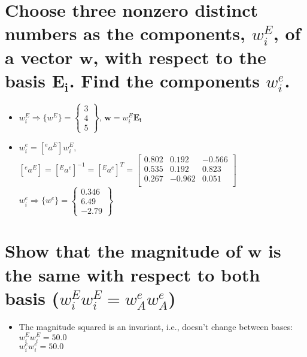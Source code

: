 \documentclass[10pt, letterpaper]{article}
\begin{document}
\section{Choose three nonzero distinct numbers as the components, $w_i^E$, of a vector $\boldsymbol{w}$, with respect to the basis $\boldsymbol{E_i}$.  Find the components $w_i^e$.}
		\begin{itemize}
			\item $w^E_i \Rightarrow \{w^E\} = \begin{Bmatrix} 3 \\ 4 \\ 5 \end{Bmatrix}$, \qquad $\boldsymbol{w} = w^E_i 						\boldsymbol{E_i}$
			\item $w^e_i = [{}^e a^E] {w^E_i},$ \\
					 $[{}^e a^E] = [{}^E a^e]^{-1} = [{}^E a^e]^{T} = \begin{bmatrix}
													0.802 & 0.192 & -0.566 \\
													0.535 & 0.192 & 0.823 \\
													0.267 & -0.962 & 0.051\\
												\end{bmatrix}$\\
				$w^e_i \Rightarrow \{ w^e \} = \begin{Bmatrix*} 0.346 \\ 6.49 \\ -2.79 \end{Bmatrix*}$

		\end{itemize} 

\section {Show that the magnitude of $\boldsymbol{w}$ is the same with respect to both basis ($w^E_i w^E_i = w^e_A w^e_A$)}
	\begin{itemize}
		\item The magnitude squared is an invariant, i.e., doesn't change between bases:\\
			$w^E_i w^E_i = 50.0$ \\
			 $w^e_i w^e_i = 50.0$
	\end{itemize}
	
\end{document}
